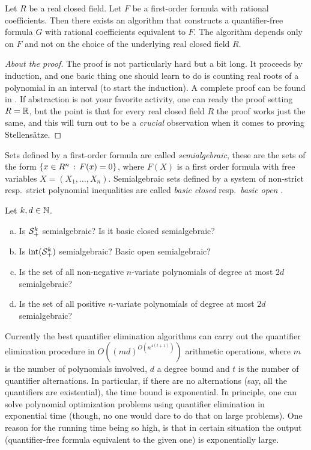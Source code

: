 \begin{theorem} 
	\label{thm:tarski-seidenberg}
	Let $R$ be a real closed field. Let $F$ be a first-order formula with rational coefficients. Then there exists an algorithm that constructs a quantifier-free formula $G$ with rational coefficients equivalent to $F$. The algorithm depends only on $F$ and not on the choice of the underlying real closed field $R$. 
\end{theorem}
\begin{proof}[About the proof]
	The proof is not particularly hard but a bit long. It proceeds by induction, and one basic thing one should learn to do is counting real roots of a polynomial in an interval (to start the induction). A complete proof can be found in \cite[Th.~1.4.6]{Bochnak:Coste:Roy:1998}. If abstraction is not your favorite activity, one can ready the proof setting $R=\mathbb{R}$, but the point is that for every real closed field $R$ the proof works just the same, and this will turn out to be a \emph{crucial} observation when it comes to proving Stellensätze. 
\end{proof}

Sets defined by a first-order formula are called \emph{semialgebraic}, these are the sets of the form $\left\{ x \in R^n \,:\, F(x)=0 \right\}$, where $F(X)$ is a first order formula with free variables $X=(X_1,\ldots,X_n)$. Semialgebraic sets defined by a system of non-strict resp.\ strict polynomial inequalities are called \emph{basic closed} resp.\ \emph{basic open} .

\begin{exercise}
	Let $k,d \in \mathbb{N}$. 
	\begin{enumerate}[(a)]
		\item Is $\mathcal{S}_+^k$ semialgebraic? Is it basic closed semialgebraic?
		\item Is $\operatorname{int}(\mathcal{S}_+^k)$ semialgebraic? Basic open semialgebraic?
		\item Is the set of all non-negative $n$-variate polynomials of degree at most $2d$ semialgebraic?
		\item Is the set of all positive $n$-variate polynomials of degree at most $2d$ semialgebraic?
	\end{enumerate}
\end{exercise}

\begin{remark}
	Currently the best quantifier elimination algorithms can carry out the quantifier elimination procedure in $O((m d)^{O(n^{4 (t+1)})})$ arithmetic operations, where $m$ is the number of polynomials involved, $d$ a degree bound and $t$ is the number of quantifier alternations. In particular, if there are no alternations (say, all the quantifiers are existential), the time bound is exponential. In principle, one can solve polynomial optimization problems using quantifier elimination in exponential time (though, no one  would dare to do that on large problems). One reason for the running time being so high, is that in certain situation the output (quantifier-free formula equivalent to the given one) is exponentially large. 
\end{remark}

